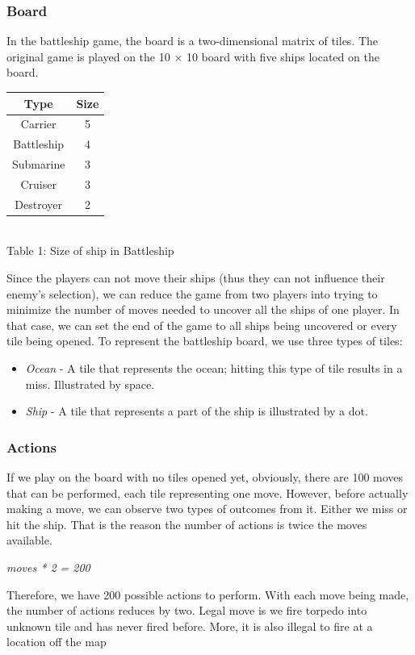 \documentclass{article}
\begin{document}
\begin{multicols}{2}
\subsubsection{Board}
In the battleship game, the board is a two-dimensional matrix of tiles. The original game is played on the 10 × 10 board with five ships located on the board. 
\begin{center}
\begin{tabular}{|c | c|} 
 \hline
 \textbf{Type} & \textbf{Size}\\ [0.5ex] 
 \hline
 Carrier & 5 \\ 
 \hline
 Battleship & 4\\
 \hline
 Submarine & 3\\
 \hline
 Cruiser & 3\\
 \hline
 Destroyer & 2\\
 \hline
 \hline 
\end{tabular}
\\[1.5ex]Table 1: Size of ship in Battleship
\end{center}
Since the players can not move their ships (thus they can not influence their enemy's selection), we can reduce the game from two players into trying to minimize the number of moves needed to uncover all the ships of one player. In that case, we can set the end of the game to all ships being uncovered or every tile being opened.
To represent the battleship board, we use three types of tiles:
\begin{itemize}
  \item \textit{Ocean} - A tile that represents the ocean; hitting this type of tile results in a miss. Illustrated by space.
  \item \textit{Ship} - A tile that represents a part of the ship is illustrated by a dot.
\end{itemize}
\subsubsection{Actions}
If we play on the board with no tiles opened yet, obviously, there are 100 moves that can be performed, each tile representing one move. However, before actually making a move, we can observe two types of outcomes from it. Either we miss or hit the ship. That is the reason the number of actions is twice the moves available. 
\begin{center}
\textit{moves * 2 = 200 }
\end{center}
Therefore, we have 200 possible actions to perform. With each move being made, the number of actions reduces by two.
Legal move is we fire torpedo into unknown tile and has never fired before. More, it is also illegal to fire at a location off the map

\end{multicols}
\end{document}
